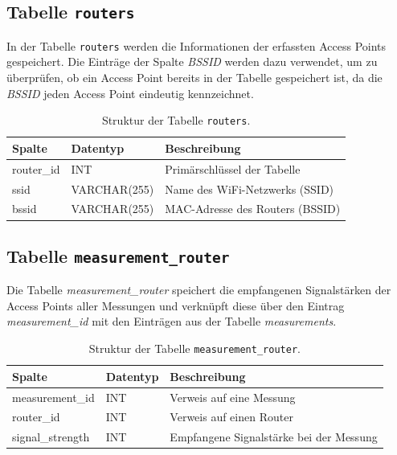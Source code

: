 \subsection{Tabelle \texttt{routers}}

In der Tabelle \texttt{routers} werden die Informationen der erfassten Access Points gespeichert. Die Einträge der Spalte \textit{BSSID} werden dazu verwendet, um zu überprüfen, ob ein Access Point bereits in der Tabelle gespeichert ist, da die \textit{BSSID} jeden Access Point eindeutig kennzeichnet.

\begin{table}[h]
    \centering
    \begin{tabularx}{\textwidth}{|l|l|X|}
        \hline
        \textbf{Spalte} & \textbf{Datentyp} & \textbf{Beschreibung} \\ \hline
        router\_id & INT  & Primärschlüssel der Tabelle \\ \hline
        ssid & VARCHAR(255) & Name des WiFi-Netzwerks (SSID) \\ \hline
        bssid & VARCHAR(255) & MAC-Adresse des Routers (BSSID) \\ \hline
    \end{tabularx}
    \caption{Struktur der Tabelle \texttt{routers}.}
    \label{tab:routers}
\end{table}

\subsection{Tabelle \texttt{measurement\_router}}


Die Tabelle \textit{measurement\_router} speichert die empfangenen Signalstärken der Access Points aller Messungen und verknüpft diese über den Eintrag \textit{measurement\_id} mit den Einträgen aus der Tabelle \textit{measurements}. 

\begin{table}[h]
    \centering
    \begin{tabularx}{\textwidth}{|l|l|X|}
        \hline
        \textbf{Spalte} & \textbf{Datentyp} & \textbf{Beschreibung} \\ \hline
        measurement\_id & INT & Verweis auf eine Messung \\ \hline
        router\_id & INT & Verweis auf einen Router \\ \hline
        signal\_strength & INT & Empfangene Signalstärke bei der Messung \\ \hline
    \end{tabularx}
    \caption{Struktur der Tabelle \texttt{measurement\_router}.}
    \label{tab:measurement_router}
\end{table}

